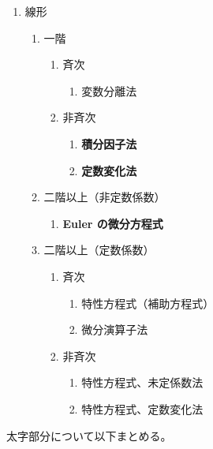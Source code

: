 \begin{enumerate}[label=\Alph*.]
  \item 線形 
  \begin{enumerate}[label=\arabic*.]
    \item 一階 
    \begin{enumerate}[label=\roman*.]
      \item 斉次 
      \begin{enumerate}[label=\bullet]
        \item 変数分離法
      \end{enumerate}
      \item 非斉次
      \begin{enumerate}[label=\bullet]
        \item \textbf{積分因子法} 
        \item \textbf{定数変化法}
      \end{enumerate}
    \end{enumerate}
    \item 二階以上（非定数係数）
    \begin{enumerate}[label=\bullet]
      \item \textbf{Euler の微分方程式} 
    \end{enumerate}
    \item 二階以上（定数係数）
    \begin{enumerate}[label=\roman*.]
      \item 斉次
      \begin{enumerate}[label=\bullet]
        \item 特性方程式（補助方程式）
        \item 微分演算子法
      \end{enumerate}
      \item 非斉次
      \begin{enumerate}[label=\bullet]
        \item 特性方程式、未定係数法
        \item 特性方程式、定数変化法
      \end{enumerate}
    \end{enumerate}
  \end{enumerate}
\end{enumerate}

太字部分について以下まとめる。

